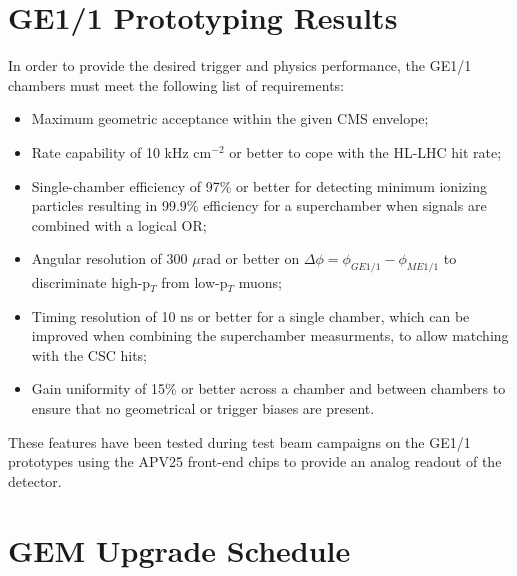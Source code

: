   \section{GE1/1 Prototyping Results}

    In order to provide the desired trigger and physics performance, the GE1/1 chambers must meet the following list of requirements:
    \begin{itemize}
      \item Maximum geometric acceptance within the given CMS envelope;
      \item Rate capability of 10 kHz cm$^{-2}$ or better to cope with the HL-LHC hit rate;
      \item Single-chamber efficiency of 97\% or better for detecting minimum ionizing particles resulting in 99.9\% efficiency for a superchamber when signals are combined with a logical OR;
      \item Angular resolution of 300 $\mu$rad or better on $ \Delta \phi = \phi_{GE1/1} - \phi_{ME1/1} $ to discriminate high-p$_T$ from low-p$_T$ muons;
      \item Timing resolution of 10 ns or better for a single chamber, which can be improved when combining the superchamber measurments, to allow matching with the CSC hits;
      \item Gain uniformity of 15\% or better across a chamber and between chambers to ensure that no geometrical or trigger biases are present. \\
    \end{itemize}

    These features have been tested during test beam campaigns on the GE1/1 prototypes using the APV25 front-end chips to provide an analog readout of the detector.
































  \section{GEM Upgrade Schedule}
